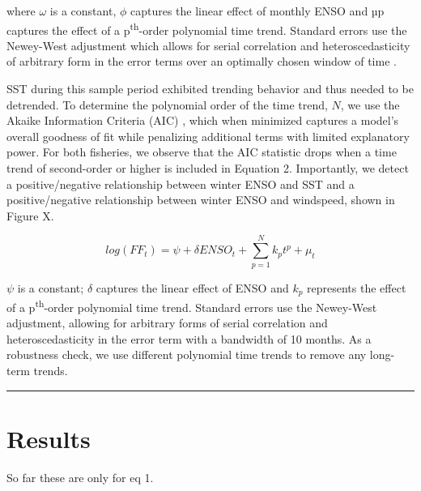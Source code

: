 \documentclass[]{article}
\begin{document}
where \(\omega\) is a constant, \(\phi\) captures the linear effect of
monthly ENSO and µp captures the effect of a p\textsuperscript{th}-order
polynomial time trend. Standard errors use the Newey-West adjustment
which allows for serial correlation and heteroscedasticity of arbitrary
form in the error terms over an optimally chosen window of time
\citep{newey_1987,newey_1994}.

SST during this sample period exhibited trending behavior and thus
needed to be detrended. To determine the polynomial order of the time
trend, \(N\), we use the Akaike Information Criteria (AIC)
\citep{akaike_1974}, which when minimized captures a model's overall
goodness of fit while penalizing additional terms with limited
explanatory power. For both fisheries, we observe that the AIC statistic
drops when a time trend of second-order or higher is included in
Equation 2. Importantly, we detect a positive/negative relationship
between winter ENSO and SST and a positive/negative relationship between
winter ENSO and windspeed, shown in Figure X.

\[log(FF_t) = \psi + \delta ENSO_t + \sum_{p = 1}^{N}{k_pt^p} + \mu_t\]

\(\psi\) is a constant; \(\delta\) captures the linear effect of ENSO
and \(k_p\) represents the effect of a p\textsuperscript{th}-order
polynomial time trend. Standard errors use the Newey-West adjustment,
allowing for arbitrary forms of serial correlation and
heteroscedasticity in the error term with a bandwidth of 10 months. As a
robustness check, we use different polynomial time trends to remove any
long-term trends.

\begin{center}\rule{0.5\linewidth}{\linethickness}\end{center}

\hypertarget{results}{%
\section{Results}\label{results}}

So far these are only for eq 1.
\end{document}
